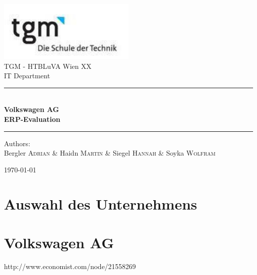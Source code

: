\documentclass[12pt]{article}
\begin{document}
	\begin{titlepage}
		\begin{center}
			\includegraphics[width=0.5\textwidth]{images/logo}\\[1cm]    
			
			\LARGE TGM - HTBLuVA Wien XX \\ IT Department  \\[1.5cm]
			
			\rule{1.0\textwidth}{1mm}
			{ \huge \bfseries \\[0.4cm]  \huge Volkswagen AG \\ \LARGE ERP-Evaluation \\[0.4cm] }
			
			\rule{1.0\textwidth}{1mm}
			
			
			
			\noindent 
			\vspace{5cm}
			
			\begin{center}
				\large
				Authors: \\ 
				Bergler \textsc{Adrian} \&
				Haidn \textsc{Martin} \&
				Siegel \textsc{Hannah} \&
				Soyka \textsc{Wolfram}
			\end{center}
			
			\vfill
			
			{\large \today}
			
		\end{center}
	\end{titlepage}
	
	\tableofcontents
	
	
	\ohead{\headmark}
	
	\newpage
	
	\section{Auswahl des Unternehmens}
	
	\section{Volkswagen AG}
	http://www.economist.com/node/21558269
\end{document}
